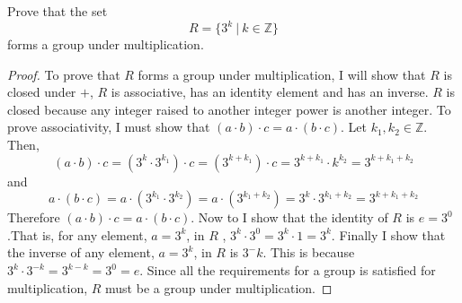 \documentclass[titlepage]{article}
\newenvironment{problem}[2][Problem]{\begin{trivlist}
\item[\hskip \labelsep {\bfseries #1}\hskip \labelsep {\bfseries #2.}]}{\end{trivlist}}
\begin{document}
\begin{problem}{10}
	Prove that the set
	$$ R = \{3^k \ | \ k \in \mathbb{Z}\}$$
	forms a group under multiplication. \\
	\begin{proof}
		To prove that $R$ forms a group under multiplication, I will show that $R$ is closed under $+$, $R$ is associative, has an identity element and has an inverse. $R$ is closed because any integer raised to another integer power is another integer. To prove associativity, I must show that $(a\cdot b)\cdot c = a \cdot (b \cdot c)$. Let $k_1,k_2 \in \mathbb{Z}$. Then,
		$$ (a\cdot b) \cdot c = (3^k \cdot 3^{k_1}) \cdot c = (3^{k+k_1}) \cdot c = 3^{k+k_1} \cdot k^{k_2} = 3^{k+k_1+k_2}$$
		and
		$$a\cdot(b\cdot c) = a\cdot(3^{k_1} \cdot 3^{k_2}) = a\cdot(3^{k_1+k_2}) = 3^k \cdot3^{k_1+k_2} = 3^{k+k_1+k_2}$$
		Therefore $(a\cdot b)\cdot c = a \cdot (b \cdot c)$. Now to I show that the identity of $R$ is $e=3^0$.That is, for any element, $a=3^k$, in $R$ , $3^k \cdot 3^0 = 3^k \cdot 1 = 3^k$. Finally I show that the inverse of any element, $a=3^k$, in $R$ is $3^-k$. This is because $3^k \cdot 3^{-k} = 3^{k-k} = 3^0 = e$. Since all the requirements for a group is satisfied for multiplication, $R$ must be a group under multiplication.
\end{proof}
\end{problem}
\end{document}
